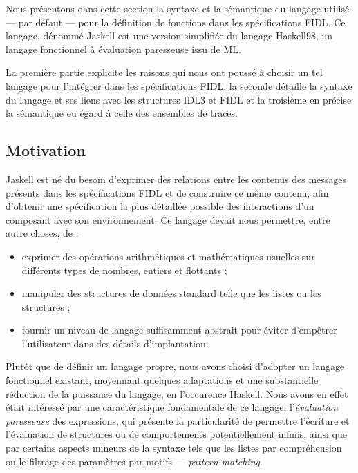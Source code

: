 
Nous pr\'esentons dans cette section la syntaxe et la s\'emantique du
langage utilis\'e --- par d\'efaut --- pour la d\'efinition de fonctions
dans les sp\'ecifications \textsf{FIDL}. Ce langage, d\'enomm\'e \textsf{Jaskell}
est une version simplifi\'ee du langage \textsf{Haskell98}, un langage
fonctionnel \`a \'evaluation paresseuse issu de \textsf{ML}. 

La premi\`ere partie explicite les raisons qui nous ont pouss\'e \`a choisir
un tel langage pour l'int\'egrer dans les sp\'ecifications \textsf{FIDL},
la seconde d\'etaille la syntaxe du langage et ses liens avec les
structures \textsf{IDL3} et \textsf{FIDL} et la troisi\`eme en pr\'ecise
la s\'emantique eu \'egard \`a celle des ensembles de traces. 

\subsection{Motivation}

\textsf{Jaskell} est n\'e du besoin d'exprimer des relations entre les
contenus des messages pr\'esents dans les sp\'ecifications FIDL et de
construire ce m\^eme contenu, afin d'obtenir une sp\'ecification la plus
d\'etaill\'ee possible des interactions d'un composant avec son
environnement. Ce langage devait nous permettre, entre autre choses, de :
\begin{itemize}
  \item exprimer des op\'erations arithm\'etiques et math\'ematiques
  usuelles sur diff\'erents types de nombres, entiers et flottants ; 
\item manipuler des structures de donn\'ees standard telle que les
  listes ou les structures ;
\item fournir un niveau de langage suffisamment abstrait pour \'eviter
  d'emp\^etrer l'utilisateur dans des d\'etails d'implantation.
\end{itemize}

Plut\^ot que de d\'efinir un langage propre, nous avons choisi
d'adopter un langage fonctionnel existant, moyennant quelques
adaptations et une substantielle r\'eduction de la puissance du
langage, en l'occurence \textsf{Haskell}. Nous avons en effet \'etait
int\'eress\'e par une caract\'eristique fondamentale de ce langage,
l'\emph{\'evaluation paresseuse} des expressions, qui pr\'esente la particularit\'e
de permettre l'\'ecriture et l'\'evaluation de structures ou de
comportements potentiellement infinis, ainsi que par certains aspects
mineurs de la syntaxe tels que les listes par compr\'ehension ou le
filtrage des param\`etres par motifs --- \emph{pattern-matching}. 

